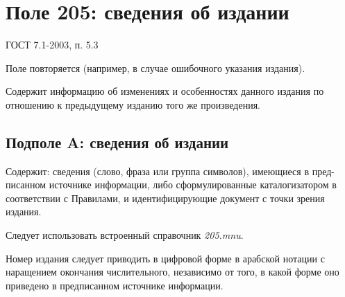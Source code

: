 \section*{Поле 205: сведения об издании}

ГОСТ 7.1-2003, п. 5.3

Поле повторяется (например, в случае ошибочного указания издания).

Содержит информацию об изменениях и особенностях данного издания по отношению к предыдущему изданию того же произведения.

\subsection*{Подполе A: сведения об издании}

Содержит: сведения (слово, фраза или группа символов), имеющиеся в пред-писанном источнике информации, либо сформулированные каталогизатором в соответствии с Правилами, и идентифицирующие документ с точки зрения издания.

Следует использовать встроенный справочник \textit{205.mnu}.

Номер издания следует приводить в цифровой форме в арабской нотации с наращением окончания числительного, независимо от того, в какой форме оно приведено в предписанном источнике информации.
